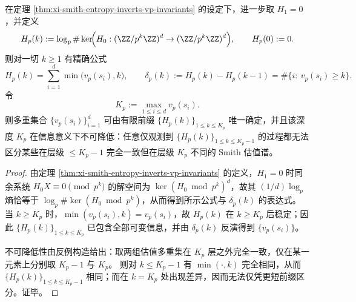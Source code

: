 \begin{corollary}\label{cor:xi-smith-entropy-minimal-depth}
在定理 \ref{thm:xi-smith-entropy-inverts-vp-invariants} 的设定下，进一步取 \(H_1=0\)，并定义
\[
H_p(k):=\log_p\#\ker\!\Bigl(H_0:(\ZZ/p^k\ZZ)^d\to(\ZZ/p^k\ZZ)^d\Bigr),
\qquad H_p(0):=0.
\]
则对一切 \(k\ge 1\) 有精确公式
\[
H_p(k)=\sum_{i=1}^{d}\min\bigl(v_p(s_i),k\bigr),
\qquad
\delta_p(k):=H_p(k)-H_p(k-1)=\#\{i:\ v_p(s_i)\ge k\}.
\]
令
\[
K_p:=\max_{1\le i\le d} v_p(s_i).
\]
则多重集合 \(\{v_p(s_i)\}_{i=1}^{d}\) 可由有限前缀 \(\{H_p(k)\}_{1\le k\le K_p}\) 唯一确定，并且该深度 \(K_p\) 在信息意义下不可降低：任意仅观测到 \(\{H_p(k)\}_{1\le k\le K_p-1}\) 的过程都无法区分某些在层级 \(\le K_p-1\) 完全一致但在层级 \(K_p\) 不同的 Smith 估值谱。
\end{corollary}
\begin{proof}
由定理 \ref{thm:xi-smith-entropy-inverts-vp-invariants} 的定义，\(H_1=0\) 时同余系统 \(H_0X\equiv 0\pmod{p^k}\) 的解空间为 \(\ker(H_0\bmod p^k)^d\)，故其 \((1/d)\log_p\) 熵恰等于 \(\log_p\#\ker(H_0\bmod p^k)\)，从而得到所示公式与 \(\delta_p(k)\) 的表达式。
当 \(k\ge K_p\) 时，\(\min(v_p(s_i),k)=v_p(s_i)\)，故 \(H_p(k)\) 在 \(k\ge K_p\) 后稳定；因此 \(\{H_p(k)\}_{1\le k\le K_p}\) 已包含全部可变信息，并由 \(\delta_p(k)\) 反演得到 \(\{v_p(s_i)\}\)。
\par
不可降低性由反例构造给出：取两组估值多重集在 \(K_p\) 层之外完全一致，仅在某一元素上分别取 \(K_p-1\) 与 \(K_p\)。
则对 \(k\le K_p-1\) 有 \(\min(\cdot,k)\) 完全相同，从而 \(\{H_p(k)\}_{1\le k\le K_p-1}\) 相同；而在 \(k=K_p\) 处出现差异，因而无法仅凭更短前缀区分。证毕。
\end{proof}

\endinput

